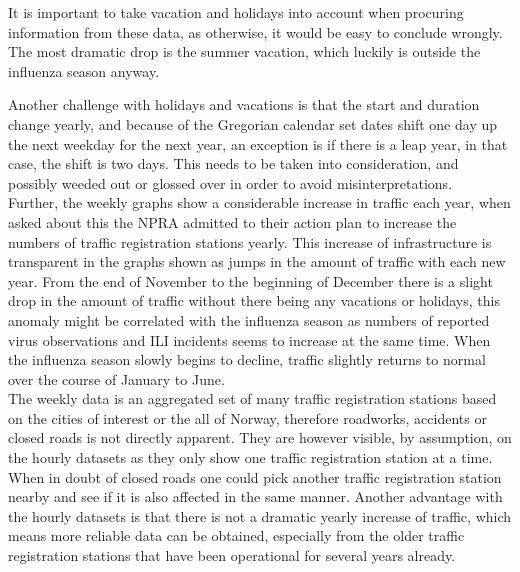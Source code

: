 It is important to take vacation and holidays into account when procuring information from these data, as otherwise, it would be easy to conclude wrongly. The most dramatic drop is the summer vacation, which luckily is outside the influenza season anyway. 

\newpage

Another challenge with holidays and vacations is that the start and duration change yearly, and because of the Gregorian calendar set dates shift one day up the next weekday for the next year, an exception is if there is a leap year, in that case, the shift is two days. This needs to be taken into consideration, and possibly weeded out or glossed over in order to avoid misinterpretations.
\\
Further, the weekly graphs show a considerable increase in traffic each year, when asked about this the NPRA admitted to their action plan to increase the numbers of traffic registration stations yearly. This increase of infrastructure is transparent in the graphs shown as jumps in the amount of traffic with each new year. From the end of November to the beginning of December there is a slight drop in the amount of traffic without there being any vacations or holidays, this anomaly might be correlated with the influenza season as numbers of reported virus observations and ILI incidents seems to increase at the same time. When the influenza season slowly begins to decline, traffic slightly returns to normal over the course of January to June. \\
The weekly data is an aggregated set of many traffic registration stations based on the cities of interest or the all of Norway, therefore roadworks, accidents or closed roads is not directly apparent. They are however visible, by assumption, on the hourly datasets as they only show one traffic registration station at a time. When in doubt of closed roads one could pick another traffic registration station nearby and see if it is also affected in the same manner. Another advantage with the hourly datasets is that there is not a dramatic yearly increase of traffic, which means more reliable data can be obtained, especially from the older traffic registration stations that have been operational for several years already.






